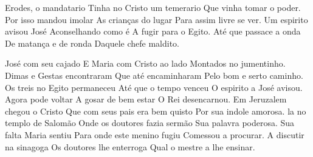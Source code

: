\documentclass{article}
\begin{document}
\begin{poem}
  \begin{stanza}
    Erodes, o mandatario         \verseline
    Tinha no Cristo um temerario \verseline
    Que vinha tomar o poder.     \verseline
    Por isso mandou imolar       \verseline
    As crianças do lugar         \verseline
    Para assim livre se ver.     \verseline
    Um espirito avisou José      \verseline
    Aconselhando como é          \verseline
    A fugir para o Egito.        \verseline
    Até que passace a onda       \verseline
    De matança e de ronda        \verseline
    Daquele chefe maldito.
  \end{stanza}
\end{poem}

\begin{poem}
  \begin{stanza}
    José com seu cajado              \verseline
    E Maria com Cristo ao lado       \verseline
    Montados no jumentinho.          \verseline
    Dimas e Gestas encontraram       \verseline
    Que até encaminharam             \verseline
    Pelo bom e serto caminho.        \verseline
    Os treis no Egito permaneceu     \verseline
    Até que o tempo venceu           \verseline
    O espirito a José avisou.        \verseline
    Agora pode voltar                \verseline
    A gosar de bem estar             \verseline
    O Rei desencarnou.               \verseline
    Em Jeruzalem chegou o Cristo     \verseline
    Que com seus pais era bem quisto \verseline
    Por sua indole amorosa.          \verseline
    la no templo de Salomão          \verseline
    Onde os doutores fazia sermão    \verseline
    Sua palavra poderosa.            \verseline
    Sua falta Maria sentiu           \verseline
    Para onde este menino fugiu      \verseline
    Comessou a procurar.             \verseline
    A discutir na sinagoga           \verseline
    Os doutores lhe enterroga        \verseline
    Qual o mestre a lhe ensinar.
  \end{stanza}
\end{poem}
\end{document}
